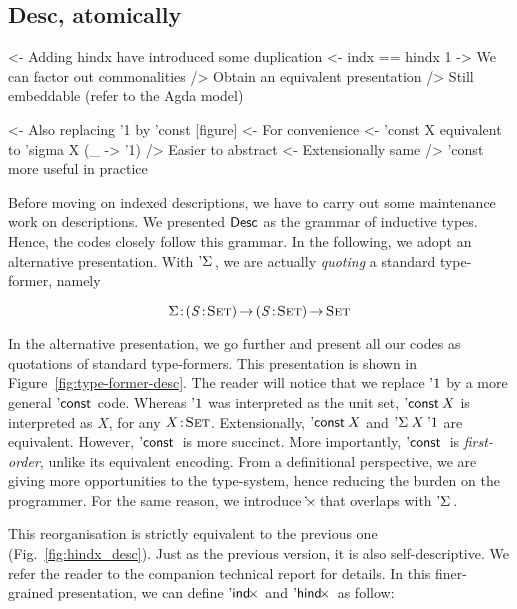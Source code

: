 \subsection{Desc, atomically}

\begin{wstructure}
<- Adding hindx have introduced some duplication
    <- indx == hindx 1
    -> We can factor out commonalities 
        /> Obtain an equivalent presentation
        /> Still embeddable (refer to the Agda model)
\end{wstructure}

\begin{wstructure}
<- Also replacing '1 by 'const  [figure]
    <- For convenience
        <- 'const X equivalent to 'sigma X (\_ -> '1)
        /> Easier to abstract
            <- Extensionally same
            /> 'const more useful in practice
\end{wstructure}


Before moving on indexed descriptions, we have to carry out some
maintenance work on descriptions. We presented $\Desc$ as the grammar
of inductive types. Hence, the codes closely follow this grammar. In
the following, we adopt an alternative presentation. With
$\DSigma{\!}{\!}$, we are actually \emph{quoting} a standard
type-former, namely

$$\Bhab{\Sigma}{\PI{\V{S}}{\Set} \PI{\V{S}}{\Set} \Set}$$

In the alternative presentation, we go further and present all our
codes as quotations of standard type-formers. This presentation is
shown in Figure~\ref{fig:type-former-desc}. The reader will notice
that we replace $\DUnit$ by a more general $\DConst{\!}$ code. Whereas
$\DUnit$ was interpreted as the unit set, $\DConst{X}$ is interpreted
as $X$, for any $\Bhab{X}{\Set}$. Extensionally, $\DConst{X}$ and
$\DSigma{X}{\DUnit}$ are equivalent. However, $\DConst$ is more
succinct. More importantly, $\DConst$ is \emph{first-order}, unlike
its equivalent encoding. From a definitional perspective, we are
giving more opportunities to the type-system, hence reducing the
burden on the programmer. For the same reason, we introduce
$\DProd{\!}{\!}$ that overlaps with $\DSigma{\!}{\!}$.

This reorganisation is strictly equivalent to the previous one
(Fig.~\ref{fig:hindx_desc}). Just as the previous version, it is also
self-descriptive. We refer the reader to the companion technical
report for details. In this finer-grained presentation, we can define
$\DIndx{\!}$ and $\DHindx{\!}{\!}$ as follow:

